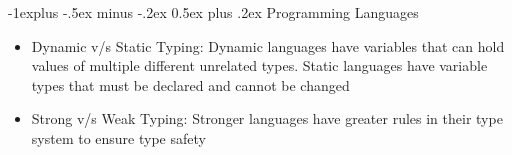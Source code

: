 \documentclass[10pt, landscape]{article}
\makeatletter
\renewcommand{\section}{\@startsection{section}{1}{0mm}%
                                {-1ex plus -.5ex minus -.2ex}%
                                {0.5ex plus .2ex}%
                                {\normalfont\large\bfseries}}
\renewcommand{\section}{\@startsection{section}{2}{0mm}%
                                {-1explus -.5ex minus -.2ex}%
                                {0.5ex plus .2ex}%
                                {\normalfont\normalsize\bfseries}}
\makeatother
\begin{document}
\raggedright
\footnotesize
\begin{multicols*}{4}


\setlength{\columnseprule}{0.25pt}
\setlength{\premulticols}{1pt}
\setlength{\postmulticols}{1pt}
\setlength{\multicolsep}{1pt}
\setlength{\columnsep}{2pt}

\begin{center}
\end{center}

\section{Programming Languages}
\begin{itemize}
\item Dynamic v/s Static Typing: Dynamic languages have variables that can hold values of multiple different unrelated types. Static languages have variable types that must be declared and cannot be changed \\
\item Strong v/s Weak Typing: Stronger languages have greater rules in their type system to ensure type safety
\end{itemize}


\end{multicols*}
\end{document}
